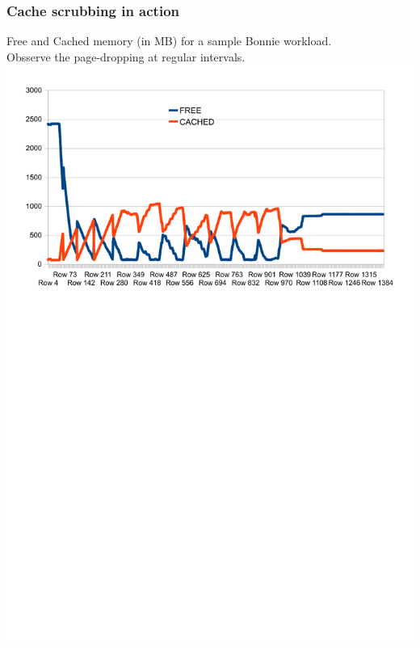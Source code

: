 \documentclass{beamer}
\begin{document}
\begin{frame}
  \frametitle{Cache scrubbing in action}
Free and Cached memory (in MB) for a sample Bonnie workload. \\
Obsserve the page-dropping at regular intervals. \\
  \includegraphics[scale=0.5]{battle.pdf}
\end{frame}
\end{document}
